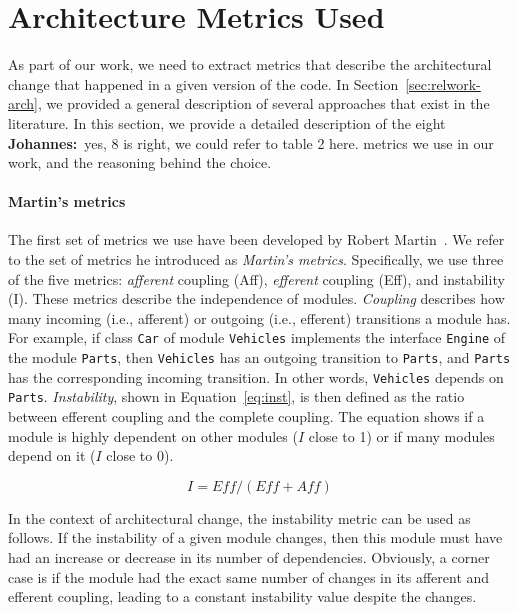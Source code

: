 \documentclass[sigplan, anonymous, review]{acmart}
\newcommand{\jk}[1]{{\color{violet}\textbf{Johannes:}~#1}}
\begin{document}
\section{Architecture Metrics Used} \label{sec:Metrics}

As part of our work, we need to extract metrics that describe the architectural change that happened in a given version of the code. 
In Section~\ref{sec:relwork-arch}, we provided a general description of several approaches that exist in the literature.
In this section, we provide a detailed description of the eight \jk{yes, 8 is right, we could refer to table 2 here.} metrics we use in our work, and the reasoning behind the choice.


\paragraph{Martin's metrics} 
The first set of metrics we use have been developed by Robert Martin~\cite{martinsMetrics}.
We refer to the set of metrics he introduced as \textit{Martin's metrics}.
Specifically, we use three of the five metrics: \textit{afferent} coupling (Aff), \textit{efferent} coupling (Eff), and instability (I).
These metrics describe the independence of modules. 
\textit{Coupling} describes how many incoming (i.e., afferent) or outgoing (i.e., efferent) transitions a module has. 
For example, if class \texttt{Car} of module \texttt{Vehicles} implements the interface \texttt{Engine} of the module \texttt{Parts}, then \texttt{Vehicles} has an outgoing transition to \texttt{Parts}, and \texttt{Parts} has the corresponding incoming transition. 
In other words, \texttt{Vehicles} depends on \texttt{Parts}.
\textit{Instability}, shown in Equation~\ref{eq:inst}, is then defined as the ratio between efferent coupling and the complete coupling.
The equation shows if a module is highly dependent on other modules ($I$ close to 1) or if many modules depend on it ($I$ close to 0).

\begin{equation} \label{eq:inst}
I = \textit{Eff} / (\textit{Eff} + \textit{Aff})
\end{equation}

In the context of architectural change, the instability metric can be used as follows. If the instability of a given module changes, then this module must have had an increase or decrease in its number of dependencies. 
Obviously, a corner case is if the module had the exact same number of changes in its afferent and efferent coupling, leading to a constant instability value despite the changes.
\end{document}
